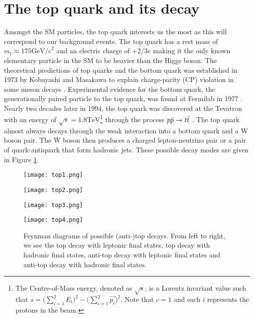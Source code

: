 \section{The top quark and its decay}
Amongst the SM particles, the top quark interests us the most as this will correspond to our background events.  The top quark has a rest mass of $m_t\approx175\text{GeV/c}^2$ and an electric charge of +2/3$e$ \cite{tanabashi2018review} making it the only known elementary particle in the SM to be heavier than the Higgs boson. The theoretical predictions of top quarks and the bottom quark was established in 1973 by Kobayashi and Masakawa to explain charge-parity (CP) violation in some meson decays \cite{griffiths2008introduction, kobayashi1973cp}. Experimental evidence for the bottom quark, the generationally paired particle to the top quark, was found at Fermilab in 1977 \cite{herb1977observation}. Nearly two decades later in 1994, the top quark was discovered at the Tevatron with an energy of $\sqrt{s}=1.8\text{TeV}$\footnote{The Centre-of-Mass energy, denoted as $\sqrt{s}$, is a Lorentz invariant value such that $s=\Big( \sum\limits_{i=1}^2 E_i \Big)^2 - \Big( \sum\limits_{i=1}^2 \overrightarrow{p_i} \Big)^2 $. Note that $c=1$ and each $i$ represents the protons in the beam.} through the process $p\Bar{p} \rightarrow t\Bar{t}$ \cite{abachi1994search, coll1994evidence, abachi1995observation}. The top quark almost always decays through the weak interaction into a bottom quark and a W boson pair. The W boson then produces a charged lepton-neutrino pair or a pair of quark-antiquark that form hadronic jets. These possible decay modes are given in Figure \ref{fig:topdecay}. \\

\begin{figure}[htbp]
    \centering
    \begin{minipage}{0.24\linewidth}
        \texttt{[image: top1.png]}
        \label{fig:top1}
    \end{minipage}
    \begin{minipage}{0.24\linewidth}
        \texttt{[image: top2.png]}
        \label{fig:anttop1}
    \end{minipage}
    \begin{minipage}{0.24\linewidth}
        \texttt{[image: top3.png]}
        \label{fig:top2}
    \end{minipage}
    \begin{minipage}{0.24\linewidth}
        \texttt{[image: top4.png]}
        \label{fig:anttop2}
    \end{minipage}
    \caption{Feynman diagrams of possible (anti-)top decays. From left to right, we see the top decay with leptonic final states, top decay with hadronic final states, anti-top decay with leptonic final states and anti-top decay with hadronic final states.}
    \label{fig:topdecay}
\end{figure}


